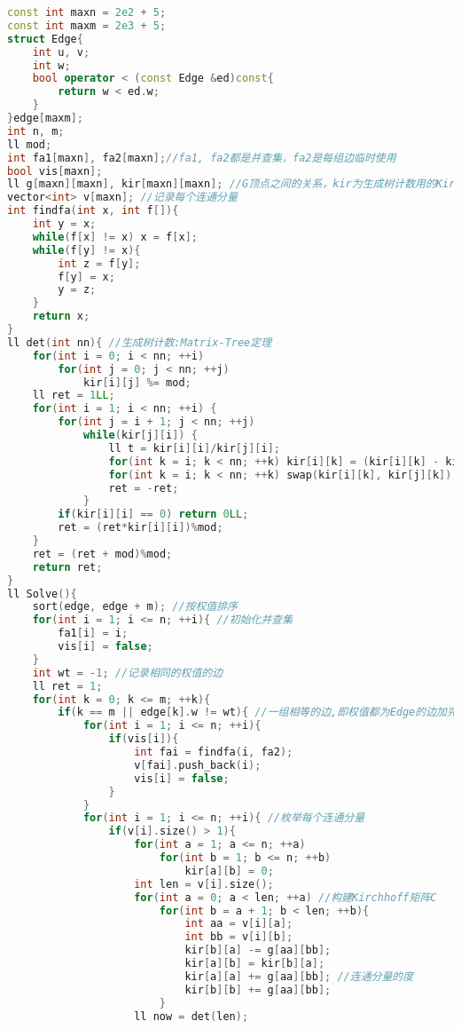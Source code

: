 \begin{lstlisting}[language=C++]
const int maxn = 2e2 + 5;
const int maxm = 2e3 + 5;
struct Edge{
    int u, v;
    int w;
    bool operator < (const Edge &ed)const{
        return w < ed.w;
    }
}edge[maxm];
int n, m;
ll mod;
int fa1[maxn], fa2[maxn];//fa1, fa2都是并查集，fa2是每组边临时使用
bool vis[maxn];
ll g[maxn][maxn], kir[maxn][maxn]; //G顶点之间的关系，kir为生成树计数用的Kirchhoff矩阵
vector<int> v[maxn]; //记录每个连通分量
int findfa(int x, int f[]){
    int y = x;
    while(f[x] != x) x = f[x];
    while(f[y] != x){
        int z = f[y];
        f[y] = x;
        y = z;
    }
    return x;
}
ll det(int nn){ //生成树计数:Matrix-Tree定理
    for(int i = 0; i < nn; ++i)
        for(int j = 0; j < nn; ++j)
            kir[i][j] %= mod;
    ll ret = 1LL;
    for(int i = 1; i < nn; ++i) {
        for(int j = i + 1; j < nn; ++j)
            while(kir[j][i]) {
                ll t = kir[i][i]/kir[j][i];
                for(int k = i; k < nn; ++k) kir[i][k] = (kir[i][k] - kir[j][k]*t)%mod;
                for(int k = i; k < nn; ++k) swap(kir[i][k], kir[j][k]);
                ret = -ret;
            }
        if(kir[i][i] == 0) return 0LL;
        ret = (ret*kir[i][i])%mod;
    }
    ret = (ret + mod)%mod;
    return ret;
}
ll Solve(){
    sort(edge, edge + m); //按权值排序
    for(int i = 1; i <= n; ++i){ //初始化并查集
        fa1[i] = i;
        vis[i] = false;
    }
    int wt = -1; //记录相同的权值的边
    ll ret = 1;
    for(int k = 0; k <= m; ++k){
        if(k == m || edge[k].w != wt){ //一组相等的边,即权值都为Edge的边加完
            for(int i = 1; i <= n; ++i){
                if(vis[i]){
                    int fai = findfa(i, fa2);
                    v[fai].push_back(i);
                    vis[i] = false;
                }
            }
            for(int i = 1; i <= n; ++i){ //枚举每个连通分量
                if(v[i].size() > 1){
                    for(int a = 1; a <= n; ++a)
                        for(int b = 1; b <= n; ++b)
                            kir[a][b] = 0;
                    int len = v[i].size();
                    for(int a = 0; a < len; ++a) //构建Kirchhoff矩阵C
                        for(int b = a + 1; b < len; ++b){
                            int aa = v[i][a];
                            int bb = v[i][b];
                            kir[b][a] -= g[aa][bb];
                            kir[a][b] = kir[b][a];
                            kir[a][a] += g[aa][bb]; //连通分量的度
                            kir[b][b] += g[aa][bb];
                        }
                    ll now = det(len);

\end{lstlisting}
